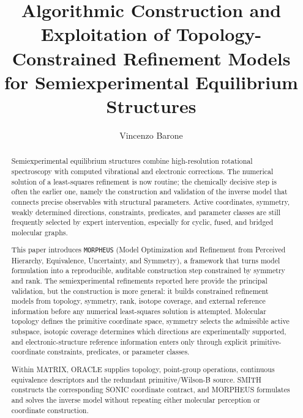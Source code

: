 \documentclass[aip,jcp,reprint,longbibliography,floatfix]{revtex4-2}
\begin{document}
\title{Algorithmic Construction and Exploitation of Topology-Constrained Refinement Models for Semiexperimental Equilibrium Structures}

\author{Vincenzo Barone}

\begin{abstract}

Semiexperimental equilibrium structures combine high-resolution rotational spectroscopy with computed vibrational and electronic corrections. The numerical solution of a least-squares refinement is now routine; the chemically decisive step is often the earlier one, namely the construction and validation of the inverse model that connects precise observables with structural parameters. Active coordinates, symmetry, weakly determined directions, constraints, predicates, and parameter classes are still frequently selected by expert intervention, especially for cyclic, fused, and bridged molecular graphs.

This paper introduces \texttt{MORPHEUS} (Model Optimization and Refinement from Perceived Hierarchy, Equivalence, Uncertainty, and Symmetry), a framework that turns model formulation into a reproducible, auditable construction step constrained by symmetry and rank. The semiexperimental refinements reported here provide the principal validation, but the construction is more general: it builds constrained refinement models from topology, symmetry, rank, isotope coverage, and external reference information before any numerical least-squares solution is attempted. Molecular topology defines the primitive coordinate space, symmetry selects the admissible active subspace, isotopic coverage determines which directions are experimentally supported, and electronic-structure reference information enters only through explicit primitive-coordinate constraints, predicates, or parameter classes.

Within MATRIX, ORACLE supplies topology, point-group operations, continuous
equivalence descriptors and the redundant primitive/Wilson-B source. SMITH
constructs the corresponding SONIC coordinate contract, and MORPHEUS
formulates and solves the inverse model without repeating either molecular
perception or coordinate construction.


\end{abstract}
\end{document}
